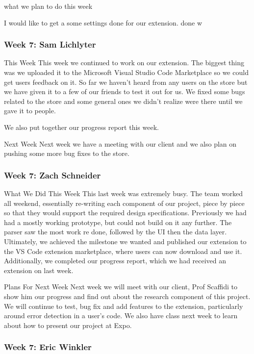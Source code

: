 what we plan to do this week 

I would like to get a some settings done for our extension. done w

\subsubsection{Week 7: Sam Lichlyter}

This Week
This week we continued to work on our extension. The biggest thing was we uploaded it to the Microsoft Visual Studio Code Marketplace so we could get users feedback on it. So far we haven't heard from any users on the store but we have given it to a few of our friends to test it out for us. We fixed some bugs related to the store and some general ones we didn't realize were there until we gave it to people. 

We also put together our progress report this week.

Next Week
Next week we have a meeting with our client and we also plan on pushing some more bug fixes to the store.

\subsubsection{Week 7: Zach Schneider}

What We Did This Week
This last week was extremely busy. The team worked all weekend, essentially re-writing each component of our project, piece by piece so that they would support the required design specifications. Previously we had had a mostly working prototype, but could not build on it any further. The parser saw the most work re done, followed by the UI then the data layer. Ultimately, we achieved the milestone we wanted and published our extension to the VS Code extension marketplace, where users can now download and use it. Additionally, we completed our progress report, which we had received an extension on last week.

Plans For Next Week
Next week we will meet with our client, Prof Scaffidi to show him our progress and find out about the research component of this project. We will continue to test, bug fix and add features to the extension, particularly around error detection in a user's code. We also have class next week to learn about how to present our project at Expo.

\subsubsection{Week 7: Eric Winkler}


